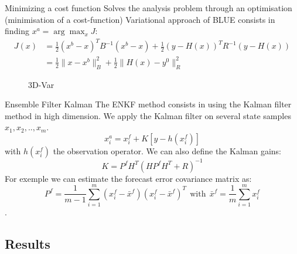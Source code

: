   \begin{frame}{Minimizing a cost function}
       Solves the analysis problem through an optimisation (minimisation of a cost-function)
       Variational approach of BLUE consists in finding $x^a=\arg\max_{x}J$:
       $$\begin{aligned}
           J(x)&=\frac{1}{2}(x^b-x)^TB^{-1}(x^b-x)+\frac{1}{2}(y-H(x))^TR^{-1}(y-H(x)) \\
           &=\frac{1}{2}\|x-x^b\|_B^2+\frac{1}{2}\|H(x)-y^0\|_R^2
       \end{aligned}$$
       \begin{figure}
           \centering
           \caption{3D-Var}
       \end{figure}
   \end{frame}
   \begin{frame}{Ensemble Filter Kalman}
       The ENKF method consists in using the Kalman filter method in high dimension.
       \newline We apply the Kalman filter on several state samples $x_1,x_2,..,x_{m}$.
       $$x_i^a=x_i^f+K[y-h(x_i^f)]$$
       with $h(x_i^f)$ the observation operator.
       We can also define the Kalman gains: 
       $$K=P^f H^T(HP^f H^T+R)^{-1}$$
       For exemple we can estimate the
       forecast error covariance matrix as:
       $$P^f=\frac{1}{m-1}\sum_{i=1}^{m}(x_i^f-\bar{x}^f)(x_i^f-\bar{x}^f)^T~~\text{with}~~\bar{x}^f=\frac{1}{m}\sum_{i=1}^{m}x_i^f $$ .
   \end{frame}
   \subsection{Results}
   
